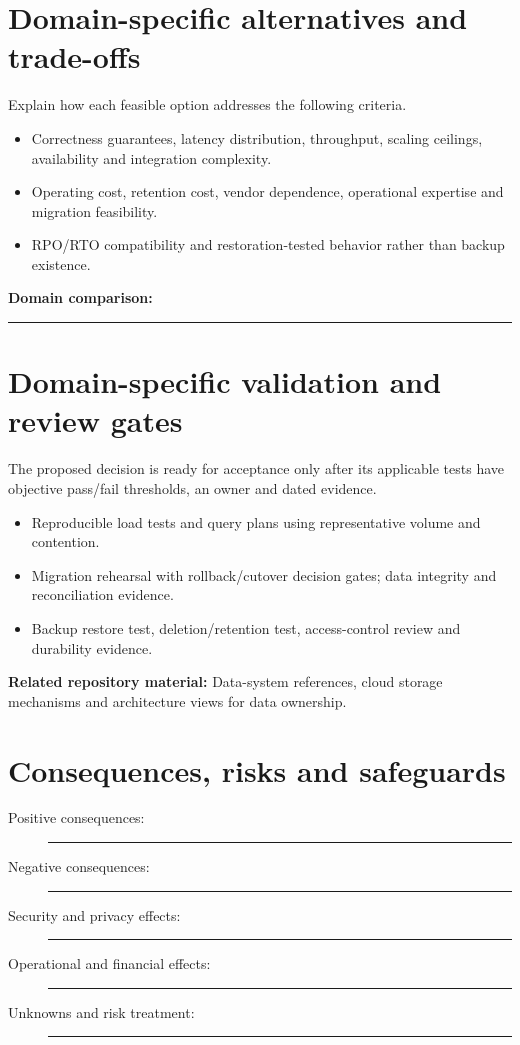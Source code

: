 \documentclass[11pt,letterpaper]{article}
\newcommand{\BlankResponse}{\rule[-0.4em]{0pt}{2em}\rule{0.65\linewidth}{0.4pt}}
\begin{document}
\section{Domain-specific alternatives and trade-offs}
Explain how each feasible option addresses the following criteria.
\begin{itemize}
\item Correctness guarantees, latency distribution, throughput, scaling ceilings, availability and integration complexity.
\item Operating cost, retention cost, vendor dependence, operational expertise and migration feasibility.
\item RPO/RTO compatibility and restoration-tested behavior rather than backup existence.
\end{itemize}
\noindent\textbf{Domain comparison:} \BlankResponse
\section{Domain-specific validation and review gates}
The proposed decision is ready for acceptance only after its applicable
tests have objective pass/fail thresholds, an owner and dated evidence.
\begin{itemize}
\item Reproducible load tests and query plans using representative volume and contention.
\item Migration rehearsal with rollback/cutover decision gates; data integrity and reconciliation evidence.
\item Backup restore test, deletion/retention test, access-control review and durability evidence.
\end{itemize}
\noindent\textbf{Related repository material:} Data-system references, cloud storage mechanisms and architecture views for data ownership.

\section{Consequences, risks and safeguards}
\begin{description}
\item[Positive consequences:] \BlankResponse
\item[Negative consequences:] \BlankResponse
\item[Security and privacy effects:] \BlankResponse
\item[Operational and financial effects:] \BlankResponse
\item[Unknowns and risk treatment:] \BlankResponse
\end{description}
\end{document}
